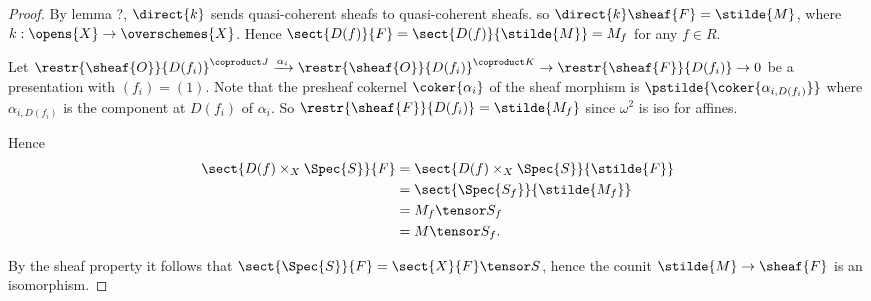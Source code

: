 \begin{proof}
By lemma ?, $\direct{k}$ sends quasi-coherent sheafs to quasi-coherent sheafs.
so $\direct{k}\sheaf{F} = \stilde{M}$,
where $k:\opens{X} \rightarrow \overschemes{X}$.
Hence $\sect{D(f)}{F} = \sect{D(f)}{\stilde{M}} = M_f$ 
for any $f\in R$.

Let 
$\restr{\sheaf{O}}{D(f_i)}^{\coproduct J} \xrightarrow{\alpha_i} \restr{\sheaf{O}}{D(f_i)}^{\coproduct K} \rightarrow \restr{\sheaf{F}}{D(f_i)} \rightarrow 0$ be a presentation with $(f_i) = (1)$.
Note that the presheaf cokernel $\coker{\alpha_i}$ of the sheaf morphism is
$\pstilde{\coker{\alpha_{i,D(f_i)}}}$ where $\alpha_{i,D(f_i)}$ is the component at $D(f_i)$ of $\alpha_i$.
So $\restr{\sheaf{F}}{D(f_i)} = \stilde{M_f}$ since $\omega^2$ is iso for affines.

Hence 
\begin{align*}
\sect{D(f) \times_X \Spec{S}}{F} &= \sect{D(f) \times_X \Spec{S}}{\stilde{F}}\\
&= \sect{\Spec{S_f}}{\stilde{M_f}} \\ 
&= M_f \tensor S_f\\
& = M \tensor S_f.
\end{align*}

By the sheaf property it follows that $\sect{\Spec{S}}{F} = \sect{X}{F} \tensor S$,
hence the counit $\stilde{M} \rightarrow \sheaf{F}$ is an isomorphism.
\end{proof}